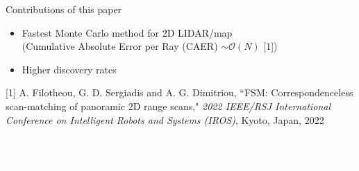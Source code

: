 \begin{frame}[noframenumbering]{Contributions of this paper}

  \begin{overlayarea}{\textwidth}{3cm}
  \leavevmode
    \begin{itemize}
      \item Fastest Monte Carlo method for 2D LIDAR/map \\
         (Cumulative Absolute Error per Ray (CAER) $\sim \mathcal{O}(N)$ [1])
      \item Higher discovery rates
    \end{itemize}




  \end{overlayarea}
  \placebottom \vspace{-1.0cm} \tiny {[1] A. Filotheou, G. D. Sergiadis and A. G. Dimitriou, ``FSM: Correspondenceless scan-matching of panoramic 2D range scans," \textit{2022 IEEE/RSJ International Conference on Intelligent Robots and Systems (IROS)}, Kyoto, Japan, 2022} \\ \textcolor{white}{[2] A. Filotheou, A. L. Symeonidis, G. D. Sergiadis, and A. G. Dimitriou, ``Correspondenceless scan-to-map-scan matching of 2D panoramic range scans", Array, 2023}
\end{frame}
